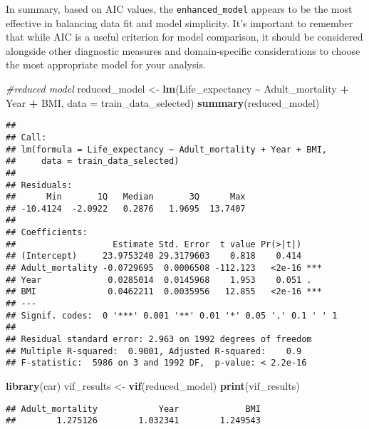 \documentclass[
]{article}
\newenvironment{Shaded}{\begin{snugshade}}{\end{snugshade}}
\newcommand{\AttributeTok}[1]{\textcolor[rgb]{0.13,0.29,0.53}{#1}}
\newcommand{\CommentTok}[1]{\textcolor[rgb]{0.56,0.35,0.01}{\textit{#1}}}
\newcommand{\FunctionTok}[1]{\textcolor[rgb]{0.13,0.29,0.53}{\textbf{#1}}}
\newcommand{\NormalTok}[1]{#1}
\newcommand{\OtherTok}[1]{\textcolor[rgb]{0.56,0.35,0.01}{#1}}
\newcommand{\SpecialCharTok}[1]{\textcolor[rgb]{0.81,0.36,0.00}{\textbf{#1}}}
\begin{document}
In summary, based on AIC values, the \texttt{enhanced\_model} appears to
be the most effective in balancing data fit and model simplicity. It's
important to remember that while AIC is a useful criterion for model
comparison, it should be considered alongside other diagnostic measures
and domain-specific considerations to choose the most appropriate model
for your analysis.

\begin{Shaded}
\begin{Highlighting}[]
\CommentTok{\#reduced model}
\NormalTok{reduced\_model }\OtherTok{\textless{}{-}} \FunctionTok{lm}\NormalTok{(Life\_expectancy }\SpecialCharTok{\textasciitilde{}}\NormalTok{ Adult\_mortality }\SpecialCharTok{+}\NormalTok{ Year }\SpecialCharTok{+}\NormalTok{ BMI, }\AttributeTok{data =}\NormalTok{ train\_data\_selected)}
\FunctionTok{summary}\NormalTok{(reduced\_model)}
\end{Highlighting}
\end{Shaded}

\begin{verbatim}
## 
## Call:
## lm(formula = Life_expectancy ~ Adult_mortality + Year + BMI, 
##     data = train_data_selected)
## 
## Residuals:
##      Min       1Q   Median       3Q      Max 
## -10.4124  -2.0922   0.2876   1.9695  13.7407 
## 
## Coefficients:
##                   Estimate Std. Error  t value Pr(>|t|)    
## (Intercept)     23.9753240 29.3179603    0.818    0.414    
## Adult_mortality -0.0729695  0.0006508 -112.123   <2e-16 ***
## Year             0.0285014  0.0145968    1.953    0.051 .  
## BMI              0.0462211  0.0035956   12.855   <2e-16 ***
## ---
## Signif. codes:  0 '***' 0.001 '**' 0.01 '*' 0.05 '.' 0.1 ' ' 1
## 
## Residual standard error: 2.963 on 1992 degrees of freedom
## Multiple R-squared:  0.9001, Adjusted R-squared:    0.9 
## F-statistic:  5986 on 3 and 1992 DF,  p-value: < 2.2e-16
\end{verbatim}

\begin{Shaded}
\begin{Highlighting}[]
\FunctionTok{library}\NormalTok{(car)}
\NormalTok{vif\_results }\OtherTok{\textless{}{-}} \FunctionTok{vif}\NormalTok{(reduced\_model)}
\FunctionTok{print}\NormalTok{(vif\_results)}
\end{Highlighting}
\end{Shaded}

\begin{verbatim}
## Adult_mortality            Year             BMI 
##        1.275126        1.032341        1.249543
\end{verbatim}
\end{document}
